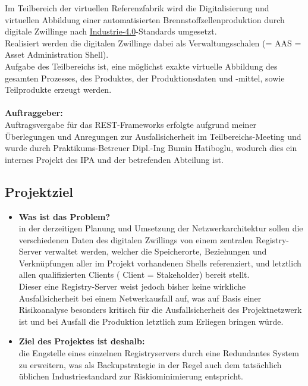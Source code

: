 Im Teilbereich der virtuellen Referenzfabrik wird die Digitalisierung und virtuellen Abbildung einer automatisierten Brennstoffzellenproduktion durch digitale Zwillinge nach \href{Navigation/DE/Home/home.html}{Industrie-4.0}-Standards umgesetzt.\\
Realisiert werden die digitalen Zwillinge dabei als Verwaltungsschalen (= AAS = Asset
Administration Shell).\\ 
 Aufgabe des Teilbereichs ist, eine möglichst exakte virtuelle Abbildung des gesamten Prozesses, des Produktes, der Produktionsdaten und -mittel, sowie Teilprodukte erzeugt werden.\\
 \\
\textbf{Auftraggeber:} \\
Auftragsvergabe für das REST-Frameworks erfolgte aufgrund meiner Überlegungen und Anregungen zur Ausfallsicherheit im Teilbereichs-Meeting und wurde durch Praktikums-Betreuer Dipl.-Ing Bumin Hatiboglu, wodurch dies ein internes Projekt des IPA und der betrefenden Abteilung ist.



\subsection{Projektziel}\label{sec:Projektziel}
\begin{itemize}
	\item \textbf{Was ist das Problem?}\\
    in der derzeitigen Planung und Umsetzung der Netzwerkarchitektur sollen die verschiedenen Daten des digitalen Zwillings von einem zentralen Registry-Server verwaltet werden, welcher die Speicherorte, Beziehungen und Verknüpfungen aller im Projekt vorhandenen Shells referenziert, und letztlich allen qualifizierten Clients ( Client = Stakeholder) bereit stellt.\\
    Dieser eine Registry-Server weist jedoch bisher keine wirkliche Ausfallsicherheit bei einem Netwerkausfall auf, was auf Basis einer Risikoanalyse besonders kritisch für die Ausfallsicherheit des Projektnetzwerk ist und bei Ausfall die Produktion letztlich zum Erliegen bringen würde.
	\item \textbf{Ziel des Projektes ist deshalb:}\\
    die Engstelle eines einzelnen Registryservers durch eine Redundantes System zu erweitern, was als Backupstrategie in der Regel  auch dem tatsächlich üblichen Industriestandard zur Riskiominimierung entspricht.  
    
\end{itemize}


